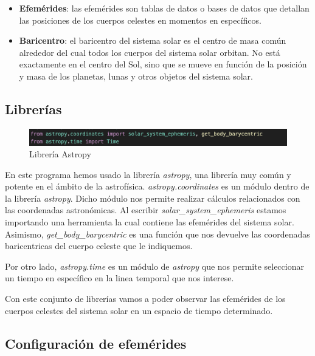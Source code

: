 \documentclass[12pt]{article}
\begin{document}
\begin{itemize}
    \item \textbf{Efemérides}: las efemérides son tablas de datos o bases de datos que detallan las posiciones
    de los cuerpos celestes en momentos en específicos.
    \item \textbf{Baricentro}: el baricentro del sistema solar es el centro de masa común alrededor del cual todos 
    los cuerpos del sistema solar orbitan. No está exactamente en el centro del Sol, 
    sino que se mueve en función de la posición y masa de los planetas, 
    lunas y otros objetos del sistema solar.
\end{itemize}


\subsection{Librerías}

\begin{figure}[!h]
    \centering
    \includegraphics[scale=0.6]{librerias.png}
    \caption{Librería Astropy}
    \label{im1}
\end{figure}
En este programa hemos usado la librería \textit{astropy}, una librería muy común y potente
en el ámbito de la astrofísica. \textit{astropy.coordinates} es un módulo dentro de la librería 
\textit{astropy}. Dicho módulo nos permite realizar cálculos relacionados con las coordenadas astronómicas.
Al escribir \textit{solar\_system\_ephemeris} estamos importando una herramienta la cual contiene las efemérides
del sistema solar. Asimismo, \textit{get\_body\_barycentric} es una función que nos devuelve 
las coordenadas baricentricas del cuerpo celeste que le indiquemos. 

\vspace{5mm}

Por otro lado, \textit{astropy.time} es un módulo de \textit{astropy} que nos permite seleccionar un tiempo
en específico en la linea temporal que nos interese.

\vspace{5mm}

Con este conjunto de librerías vamos a poder observar las efemérides de los cuerpos celestes del sistema solar 
en un espacio de tiempo determinado.

\newpage 

\subsection{Configuración de efemérides}
\end{document}
